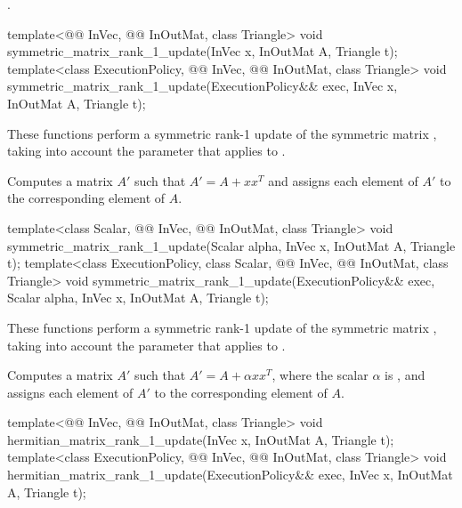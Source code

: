\pnum
\complexity
{}.

\begin{itemdecl}
template<@@ InVec, @@ InOutMat, class Triangle>
  void symmetric_matrix_rank_1_update(InVec x, InOutMat A, Triangle t);
template<class ExecutionPolicy,
         @@ InVec, @@ InOutMat, class Triangle>
  void symmetric_matrix_rank_1_update(ExecutionPolicy&& exec, InVec x, InOutMat A, Triangle t);
\end{itemdecl}

\begin{itemdescr}
\pnum
These functions perform
a symmetric rank-1 update of the symmetric matrix ,
taking into account the  parameter
that applies to .

\pnum
\effects
Computes a matrix $A'$ such that $A' = A + x x^T$
and assigns each element of $A'$ to the corresponding element of $A$.
\end{itemdescr}

\begin{itemdecl}
template<class Scalar, @@ InVec, @@ InOutMat, class Triangle>
  void symmetric_matrix_rank_1_update(Scalar alpha, InVec x, InOutMat A, Triangle t);
template<class ExecutionPolicy,
         class Scalar, @@ InVec, @@ InOutMat, class Triangle>
  void symmetric_matrix_rank_1_update(ExecutionPolicy&& exec,
                                      Scalar alpha, InVec x, InOutMat A, Triangle t);
\end{itemdecl}

\begin{itemdescr}
\pnum
These functions perform
a symmetric rank-1 update of the symmetric matrix ,
taking into account the  parameter
that applies to .

\pnum
\effects
Computes a matrix $A'$ such that
$A' = A + \alpha x x^T$, where the scalar $\alpha$ is ,
and assigns each element of $A'$ to the corresponding element of $A$.
\end{itemdescr}

\begin{itemdecl}
template<@@ InVec, @@ InOutMat, class Triangle>
  void hermitian_matrix_rank_1_update(InVec x, InOutMat A, Triangle t);
template<class ExecutionPolicy,
         @@ InVec, @@ InOutMat, class Triangle>
  void hermitian_matrix_rank_1_update(ExecutionPolicy&& exec, InVec x, InOutMat A, Triangle t);
\end{itemdecl}

